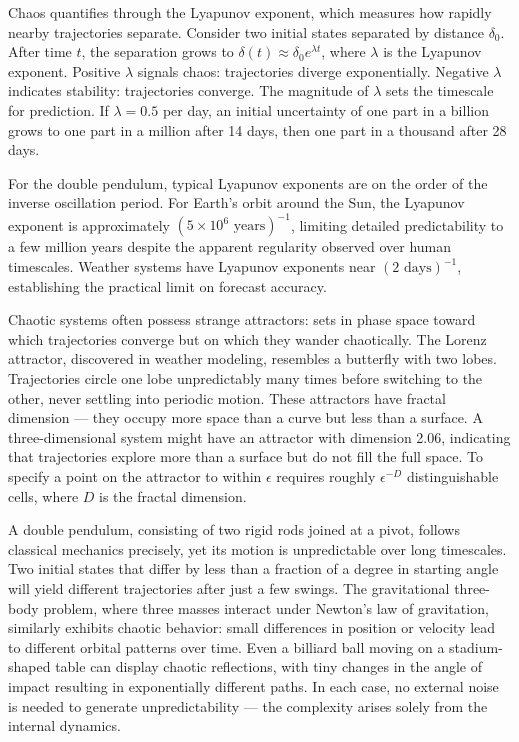 Chaos quantifies through the Lyapunov exponent, which measures how rapidly nearby trajectories separate. Consider two initial states separated by distance $\delta_0$. After time $t$, the separation grows to $\delta(t) \approx \delta_0 e^{\lambda t}$, where $\lambda$ is the Lyapunov exponent. Positive $\lambda$ signals chaos: trajectories diverge exponentially. Negative $\lambda$ indicates stability: trajectories converge. The magnitude of $\lambda$ sets the timescale for prediction. If $\lambda = 0.5$ per day, an initial uncertainty of one part in a billion grows to one part in a million after 14 days, then one part in a thousand after 28 days.

For the double pendulum, typical Lyapunov exponents are on the order of the inverse oscillation period. For Earth's orbit around the Sun, the Lyapunov exponent is approximately $(5 \times 10^{6} \text{ years})^{-1}$, limiting detailed predictability to a few million years despite the apparent regularity observed over human timescales. Weather systems have Lyapunov exponents near $(2 \text{ days})^{-1}$, establishing the practical limit on forecast accuracy.

Chaotic systems often possess strange attractors: sets in phase space toward which trajectories converge but on which they wander chaotically. The Lorenz attractor, discovered in weather modeling, resembles a butterfly with two lobes. Trajectories circle one lobe unpredictably many times before switching to the other, never settling into periodic motion. These attractors have fractal dimension — they occupy more space than a curve but less than a surface. A three-dimensional system might have an attractor with dimension 2.06, indicating that trajectories explore more than a surface but do not fill the full space. To specify a point on the attractor to within $\epsilon$ requires roughly $\epsilon^{-D}$ distinguishable cells, where $D$ is the fractal dimension.

A double pendulum, consisting of two rigid rods joined at a pivot, follows classical mechanics precisely, yet its motion is unpredictable over long timescales. Two initial states that differ by less than a fraction of a degree in starting angle will yield different trajectories after just a few swings. The gravitational three-body problem, where three masses interact under Newton's law of gravitation, similarly exhibits chaotic behavior: small differences in position or velocity lead to different orbital patterns over time. Even a billiard ball moving on a stadium-shaped table can display chaotic reflections, with tiny changes in the angle of impact resulting in exponentially different paths. In each case, no external noise is needed to generate unpredictability — the complexity arises solely from the internal dynamics.

